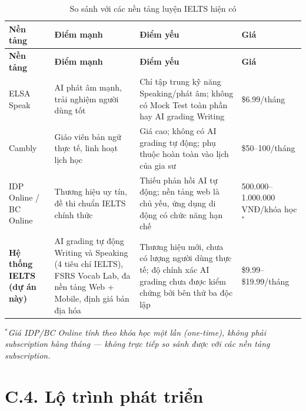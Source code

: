 \setlength{\tbu}{\dimexpr(\linewidth - 8\tabcolsep - 5\arrayrulewidth)/140\relax}
\begin{longtable}{|p{28\tbu}|p{45\tbu}|p{37\tbu}|p{30\tbu}|}
    \caption{So sánh với các nền tảng luyện IELTS hiện có} \label{tab:competitor} \\
    \hline
    \textbf{Nền tảng} & \textbf{Điểm mạnh} & \textbf{Điểm yếu} & \textbf{Giá} \\ \hline
    \endfirsthead
    \hline
    \textbf{Nền tảng} & \textbf{Điểm mạnh} & \textbf{Điểm yếu} & \textbf{Giá} \\ \hline
    \endhead
    \hline
    \endfoot
    \endlastfoot
    ELSA Speak
      & AI phát âm mạnh, trải nghiệm người dùng tốt
      & Chỉ tập trung kỹ năng Speaking/phát âm; không có Mock Test toàn phần hay AI grading Writing
      & \$6.99/tháng \\ \hline
    Cambly
      & Giáo viên bản ngữ thực tế, linh hoạt lịch học
      & Giá cao; không có AI grading tự động; phụ thuộc hoàn toàn vào lịch của gia sư
      & \$50--100/tháng \\ \hline
    IDP Online / BC Online
      & Thương hiệu uy tín, đề thi chuẩn IELTS chính thức
      & Thiếu phản hồi AI tự động; nền tảng web là chủ yếu, ứng dụng di động có chức năng hạn chế
      & 500.000--1.000.000 VNĐ/khóa học$^*$ \\ \hline
    \textbf{Hệ thống IELTS (dự án này)}
      & AI grading tự động Writing và Speaking (4 tiêu chí IELTS), FSRS Vocab Lab, đa nền tảng Web + Mobile, định giá bản địa hóa
      & Thương hiệu mới, chưa có lượng người dùng thực tế; độ chính xác AI grading chưa được kiểm chứng bởi bên thứ ba độc lập
      & \$9.99--\$19.99/tháng \\ \hline
\end{longtable}

\noindent\textit{$^*$Giá IDP/BC Online tính theo khóa học một lần (one-time), không phải subscription hàng tháng --- không trực tiếp so sánh được với các nền tảng subscription.}

\section*{C.4. Lộ trình phát triển}

